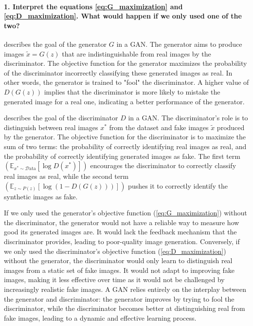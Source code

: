 \paragraph*{1. Interpret the equations \ref{eq:G_maximization} and \ref{eq:D_maximization}. What would happen if we only used one of the two?}

 describes the goal of the generator $G$ in a GAN. The generator aims to produce images $\tilde{x} = G(z)$ that are indistinguishable from real images by the discriminator. The objective function for the generator maximizes the probability of the discriminator incorrectly classifying these generated images as real. In other words, the generator is trained to "fool" the discriminator. A higher value of $D(G(z))$ implies that the discriminator is more likely to mistake the generated image for a real one, indicating a better performance of the generator.

 describes the goal of the discriminator $D$ in a GAN. The discriminator's role is to distinguish between real images $x^*$ from the dataset and fake images $\tilde{x}$ produced by the generator. The objective function for the discriminator is to maximize the sum of two terms: the probability of correctly identifying real images as real, and the probability of correctly identifying generated images as fake. The first term $\left(\mathbb{E}_{x^* \sim \mathcal{D}\text{ata}} \left[ \log D(x^*) \right]\right)$ encourages the discriminator to correctly classify real images as real, while the second term $\left(\mathbb{E}_{z \sim P(z)} \left[ \log (1 - D(G(z))) \right]\right)$ pushes it to correctly identify the synthetic images as fake.

If we only used the generator's objective function (\ref{eq:G_maximization}) without the discriminator, the generator would not have a reliable way to measure how good its generated images are. It would lack the feedback mechanism that the discriminator provides, leading to poor-quality image generation. Conversely, if we only used the discriminator's objective function (\ref{eq:D_maximization}) without the generator, the discriminator would only learn to distinguish real images from a static set of fake images. It would not adapt to improving fake images, making it less effective over time as it would not be challenged by increasingly realistic fake images. A GAN relies entirely on the interplay between the generator and discriminator: the generator improves by trying to fool the discriminator, while the discriminator becomes better at distinguishing real from fake images, leading to a dynamic and effective learning process.

